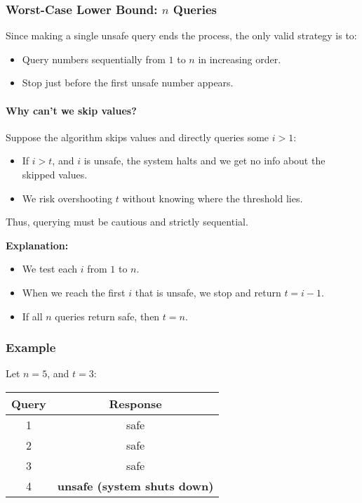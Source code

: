 \documentclass[12pt]{article}
\begin{document}
	\subsubsection*{Worst-Case Lower Bound: $n$ Queries}
	
	Since making a single unsafe query ends the process, the only valid strategy is to:
	\begin{itemize}
		\item Query numbers sequentially from $1$ to $n$ in increasing order.
		\item Stop just before the first unsafe number appears.
	\end{itemize}
	
	\paragraph{Why can’t we skip values?}
	Suppose the algorithm skips values and directly queries some $i > 1$:
	\begin{itemize}
		\item If $i > t$, and $i$ is unsafe, the system halts and we get no info about the skipped values.
		\item We risk overshooting $t$ without knowing where the threshold lies.
	\end{itemize}
	Thus, querying must be cautious and strictly sequential.
	

	
	\textbf{Explanation:}
	\begin{itemize}
		\item We test each $i$ from $1$ to $n$.
		\item When we reach the first $i$ that is unsafe, we stop and return $t = i - 1$.
		\item If all $n$ queries return safe, then $t = n$.
	\end{itemize}
	
	\subsubsection*{Example}
	Let $n = 5$, and $t = 3$:
	\begin{center}
		\begin{tabular}{c|c}
			Query & Response \\
			\hline
			1     & safe     \\
			2     & safe     \\
			3     & safe     \\
			4     & \textbf{unsafe (system shuts down)} \\
		\end{tabular}
	\end{center}
	
\end{document}
